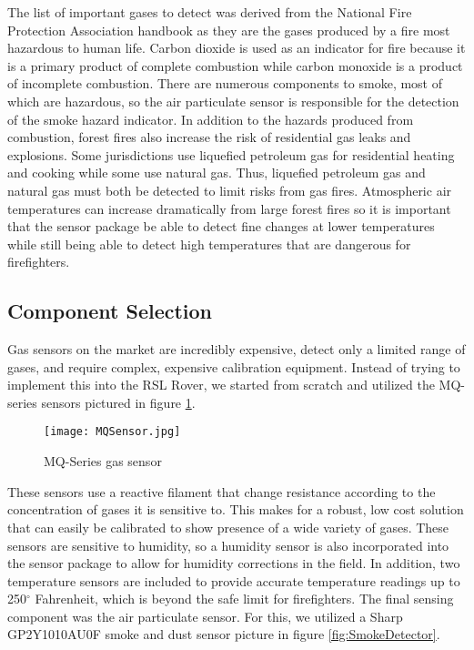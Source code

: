 The list of important gases to detect was derived from the National Fire Protection Association handbook as they are the gases produced by a fire most hazardous to human life. Carbon dioxide is used as an indicator for fire because it is a primary product of complete combustion while carbon monoxide is a product of incomplete combustion. There are numerous components to smoke, most of which are hazardous, so the air particulate sensor is responsible for the detection of the smoke hazard indicator. In addition to the hazards produced from combustion, forest fires also increase the risk of residential gas leaks and explosions. Some jurisdictions use liquefied petroleum gas for residential heating and cooking while some use natural gas. Thus, liquefied petroleum gas and natural gas must both be detected to limit risks from gas fires. Atmospheric air temperatures can increase dramatically from large forest fires so it is important that the sensor package be able to detect fine changes at lower temperatures while still being able to detect high temperatures that are dangerous for firefighters. 

\subsection{Component Selection}
Gas sensors on the market are incredibly expensive, detect only a limited range of gases, and require complex, expensive calibration equipment. Instead of trying to implement this into the RSL Rover, we started from scratch and utilized the MQ-series sensors pictured in figure \ref{fig:MQSensor}.

\begin{figure}[h!]
	\centering
	\texttt{[image: MQSensor.jpg]}
	\caption{MQ-Series gas sensor}
	\label{fig:MQSensor}
\end{figure}

These sensors use a reactive filament that change resistance according to the concentration of gases it is sensitive to. This makes for a robust, low cost solution that can easily be calibrated to show presence of a wide variety of gases. These sensors are sensitive to humidity, so a humidity sensor is also incorporated into the sensor package to allow for humidity corrections in the field. In addition, two temperature sensors are included to provide accurate temperature readings up to 250$^{\circ}$ Fahrenheit, which is beyond the safe limit for firefighters. The final sensing component was the air particulate sensor. For this, we utilized a Sharp GP2Y1010AU0F smoke and dust sensor picture in figure \ref{fig:SmokeDetector}. 

